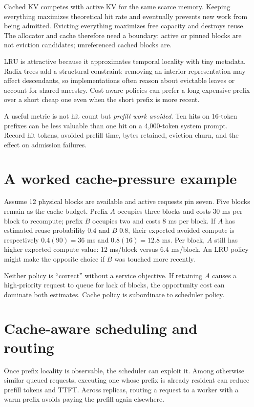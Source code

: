 Cached KV competes with active KV for the same scarce memory. Keeping everything
maximizes theoretical hit rate and eventually prevents new work from being admitted.
Evicting everything maximizes free capacity and destroys reuse. The allocator and
cache therefore need a boundary: active or pinned blocks are not eviction candidates;
unreferenced cached blocks are.

LRU is attractive because it approximates temporal locality with tiny metadata.
Radix trees add a structural constraint: removing an interior representation may
affect descendants, so implementations often reason about evictable leaves or
account for shared ancestry. Cost-aware policies can prefer a long expensive prefix
over a short cheap one even when the short prefix is more recent.

A useful metric is not hit count but \emph{prefill work avoided}. Ten hits on
16-token prefixes can be less valuable than one hit on a 4,000-token system prompt.
Record hit tokens, avoided prefill time, bytes retained, eviction churn, and the
effect on admission failures.

\section{A worked cache-pressure example}

Assume 12 physical blocks are available and active requests pin seven. Five blocks
remain as the cache budget. Prefix $A$ occupies three blocks and costs 30 ms per block
to recompute; prefix $B$ occupies two and costs 8 ms per block. If $A$ has estimated
reuse probability 0.4 and $B$ 0.8, their expected avoided compute is respectively
$0.4(90)=36$ ms and $0.8(16)=12.8$ ms. Per block, $A$ still has higher expected
compute value: 12 ms/block versus 6.4 ms/block. An LRU policy might make the opposite
choice if $B$ was touched more recently.

Neither policy is ``correct'' without a service objective. If retaining $A$ causes a
high-priority request to queue for lack of blocks, the opportunity cost can dominate
both estimates. Cache policy is subordinate to scheduler policy.

\section{Cache-aware scheduling and routing}

Once prefix locality is observable, the scheduler can exploit it. Among otherwise
similar queued requests, executing one whose prefix is already resident can reduce
prefill tokens and TTFT. Across replicas, routing a request to a worker with a warm
prefix avoids paying the prefill again elsewhere.


